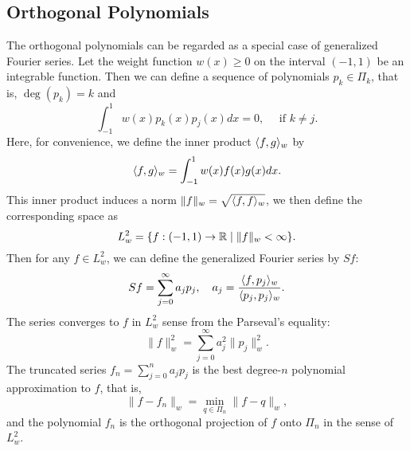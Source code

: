 \subsection{Orthogonal Polynomials}
\label{SSec: 3-Ort-Pol}
The orthogonal polynomials can be regarded as a special case of generalized Fourier series.  Let the weight function $w(x)\ge 0$ on the interval $(-1, 1)$ be an integrable function. Then we can define a sequence of polynomials $p_k\in \Pi_k$, that is, $\deg (p_k) = k$ and 
\begin{equation}
    \int_{-1}^1 w(x) p_k(x) p_j(x) dx = 0,\quad \text{ if } k\neq j.
\end{equation}
Here, for convenience, we define the inner product $\langle {f, g} \rangle_w$ by 
\begin{equation}
    \langle {f, g} \rangle_w = \int_{-1}^1 w(x) f(x) g(x) dx.
\end{equation}
This inner product induces a norm $\|f\|_w = \sqrt{\langle {f, f} \rangle_w}$, we then define the corresponding space as 
\begin{equation}
    L^2_w = \{ f: (-1,1)\to\mathbb R \mid \|f\|_w < \infty\}.
\end{equation}
Then for any $f\in L^2_w$, we can define the generalized Fourier series by $S f$:
\begin{equation}
    Sf = \sum_{j = 0}^{\infty} a_j p_j,\quad a_j = \frac{\langle {f, p_j} \rangle_w}{\langle {p_j, p_j} \rangle_w}.
\end{equation} 
The series converges to $f$ in $L^2_w$ sense from the Parseval's equality:
\begin{equation}
    \|f\|^2_w = \sum_{j = 0}^{\infty} a_j^2 \|p_j\|_w^2. 
\end{equation}
The truncated series $f_n = \sum_{j=0}^n a_j p_j$
is the best degree-$n$ polynomial approximation to $f$, that is,
$$\|f - f_n\|_w = \min_{q \in \Pi_n} \|f - q\|_w, $$
and the polynomial $f_n$ is the orthogonal projection of $f$ onto $\Pi_n$ in the sense of $L^2_w$.

